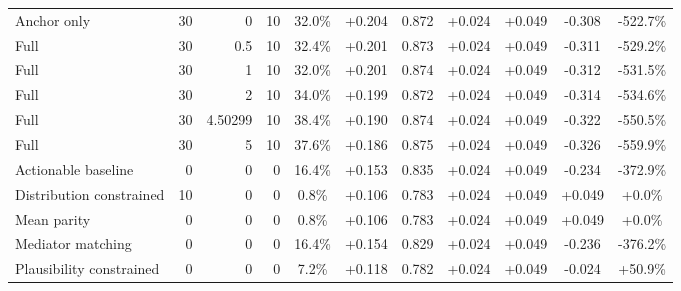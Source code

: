 \begin{table}[htbp]
\begin{tabular}{lrrrccccccc}
Anchor only & 30 & 0 & 10 & 32.0\% & +0.204 & 0.872 & +0.024 & +0.049 & -0.308 & -522.7\% \\
Full & 30 & 0.5 & 10 & 32.4\% & +0.201 & 0.873 & +0.024 & +0.049 & -0.311 & -529.2\% \\
Full & 30 & 1 & 10 & 32.0\% & +0.201 & 0.874 & +0.024 & +0.049 & -0.312 & -531.5\% \\
Full & 30 & 2 & 10 & 34.0\% & +0.199 & 0.872 & +0.024 & +0.049 & -0.314 & -534.6\% \\
Full & 30 & 4.50299 & 10 & 38.4\% & +0.190 & 0.874 & +0.024 & +0.049 & -0.322 & -550.5\% \\
Full & 30 & 5 & 10 & 37.6\% & +0.186 & 0.875 & +0.024 & +0.049 & -0.326 & -559.9\% \\
Actionable baseline & 0 & 0 & 0 & 16.4\% & +0.153 & 0.835 & +0.024 & +0.049 & -0.234 & -372.9\% \\
Distribution constrained & 10 & 0 & 0 & 0.8\% & +0.106 & 0.783 & +0.024 & +0.049 & +0.049 & +0.0\% \\
Mean parity & 0 & 0 & 0 & 0.8\% & +0.106 & 0.783 & +0.024 & +0.049 & +0.049 & +0.0\% \\
Mediator matching & 0 & 0 & 0 & 16.4\% & +0.154 & 0.829 & +0.024 & +0.049 & -0.236 & -376.2\% \\
Plausibility constrained & 0 & 0 & 0 & 7.2\% & +0.118 & 0.782 & +0.024 & +0.049 & -0.024 & +50.9\% \\
\bottomrule
\end{tabular}
\end{table}